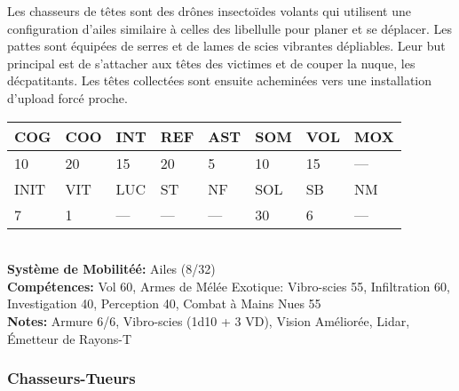 Les chasseurs de têtes sont des drônes insectoïdes volants qui utilisent une configuration d'ailes similaire à celles des libellulle pour planer et se déplacer. Les pattes sont équipées de serres et de lames de scies vibrantes dépliables. Leur but principal est de s'attacher aux têtes des victimes et de couper la nuque, les décpatitants. Les têtes collectées sont ensuite acheminées vers une installation d'upload forcé proche. \\ \begin{tabular}{|l|l|l|l|l|l|l|l|} \hline

COG &COO &INT &REF &AST &SOM &VOL &MOX \\ \hline

10 &20 &15 &20 &5 &10 &15 &— \\ \hline

INIT &VIT &LUC &ST &NF &SOL &SB &NM \\ \hline

7 &1 &— &— &— &30 &6 &— \\ \hline

\end{tabular} \\ \textbf{Système de Mobilitéé: }Ailes (8/32) \\ \textbf{Compétences:} Vol 60, Armes de Mélée Exotique: Vibro-scies 55, Infiltration 60, Investigation 40, Perception 40, Combat à Mains Nues 55\\ \textbf{Notes:} Armure 6/6, Vibro-scies (1d10 + 3 VD), Vision Améliorée, Lidar, Émetteur de Rayons-T 

\subsubsection{Chasseurs-Tueurs} 


